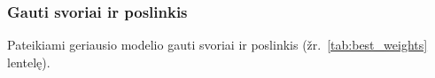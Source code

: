 \subsubsection{Gauti svoriai ir poslinkis}
\label{subsubsec:gauti_svoriai_ir_poslinkis}

Pateikiami geriausio modelio gauti svoriai ir poslinkis (žr.~\ref{tab:best_weights} lentelę).

